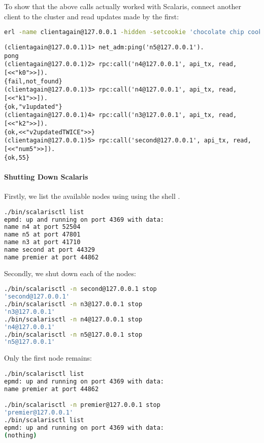 To show that the above calls actually worked with Scalaris, connect another client to the
cluster and read updates made by the first:

\begin{lstlisting}[language=sh]
erl -name clientagain@127.0.0.1 -hidden -setcookie 'chocolate chip cookie'
\end{lstlisting}

\begin{lstlisting}
(clientagain@127.0.0.1)1> net_adm:ping('n5@127.0.0.1').
pong
(clientagain@127.0.0.1)2> rpc:call('n4@127.0.0.1', api_tx, read, 
[<<"k0">>]).
{fail,not_found}
(clientagain@127.0.0.1)3> rpc:call('n4@127.0.0.1', api_tx, read, 
[<<"k1">>]).
{ok,"v1updated"}
(clientagain@127.0.0.1)4> rpc:call('n3@127.0.0.1', api_tx, read, 
[<<"k2">>]).
{ok,<<"v2updatedTWICE">>}
(clientagain@127.0.0.1)5> rpc:call('second@127.0.0.1', api_tx, read, 
[<<"num5">>]).
{ok,55}
\end{lstlisting}

\paragraph{Shutting Down Scalaris}
Firstly, we list the available nodes using  using the shell .

\begin{lstlisting}[language=sh]
./bin/scalarisctl list
epmd: up and running on port 4369 with data:
name n4 at port 52504
name n5 at port 47801
name n3 at port 41710
name second at port 44329
name premier at port 44862
\end{lstlisting}

Secondly, we shut down each of the nodes:
\begin{lstlisting}[language=sh]
./bin/scalarisctl -n second@127.0.0.1 stop
'second@127.0.0.1'
./bin/scalarisctl -n n3@127.0.0.1 stop
'n3@127.0.0.1'
./bin/scalarisctl -n n4@127.0.0.1 stop
'n4@127.0.0.1'
./bin/scalarisctl -n n5@127.0.0.1 stop
'n5@127.0.0.1'

\end{lstlisting}

Only the first node remains:

\begin{lstlisting}[language=sh]
./bin/scalarisctl list
epmd: up and running on port 4369 with data:
name premier at port 44862

./bin/scalarisctl -n premier@127.0.0.1 stop
'premier@127.0.0.1'
./bin/scalarisctl list
epmd: up and running on port 4369 with data:
(nothing)
\end{lstlisting}

